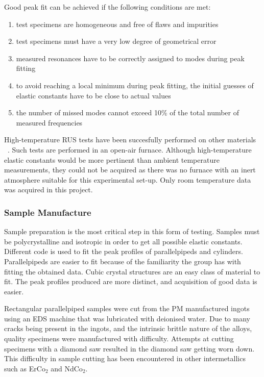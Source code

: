 Good peak fit can be achieved if the following conditions are met:
\begin{enumerate}
\item test specimens are homogeneous and free of flaws and impurities
\item test specimens must have a very low degree of geometrical error

\item measured resonances have to be correctly assigned to modes during peak fitting
\item to avoid reaching a local minimum during peak fitting, the initial guesses of elastic constants have to be close to actual values 
\item the number of missed modes cannot exceed 10\% of the total number of measured frequencies
\end{enumerate}

High-temperature RUS tests have been succesfully performed on other materials ~\cite{mcknight09}.  Such tests are performed in an open-air furnace.  Although high-temperature elastic constants would be more pertinent than ambient temperature measurements, they could not be acquired as there was no furnace with an inert atmosphere suitable for this experimental set-up.  Only room temperature data was acquired in this project.


\subsubsection{Sample Manufacture}

Sample preparation is the most critical step in this form of testing.  Samples must be polycrystalline and isotropic in order to get all possible elastic constants.  Different code is used to fit the peak profiles of parallelpipeds and cylinders.  Parallelpipeds are easier to fit because of the familiarity the group has with fitting the obtained data.  Cubic crystal structures are an easy class of material to fit.  The peak profiles produced are more distinct, and acquisition of good data is easier.

Rectangular parallelpiped samples were cut from the PM manufactured ingots using an EDS machine that was lubricated with deionised water.  Due to many cracks being present in the ingots, and the intrinsic brittle nature of the alloys, quality specimens were manufactured with difficulty.  Attempts at cutting specimens with a diamond saw resulted in the diamond saw getting worn down.  This difficulty in sample cutting has been encountered in other intermetallics such as ErCo$_2$ and NdCo$_2$.  


